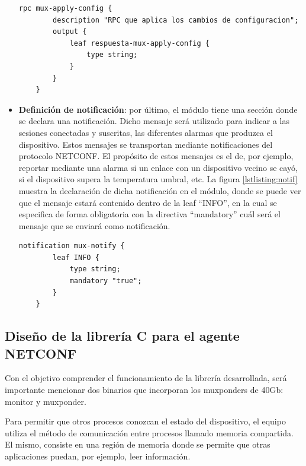 \begin{itemize}
    \newpage

    \begin{lstlisting}[language=SHELXL, caption=Declaración de RPC., label=lstlisting:RPC]
    rpc mux-apply-config {        
        description "RPC que aplica los cambios de configuracion";
        output {
            leaf respuesta-mux-apply-config {
                type string;
            }
        }
    }
    \end{lstlisting}

    \item \textbf{Definición de notificación}: por último, el módulo tiene una sección donde se declara una notificación. Dicho mensaje será utilizado para indicar a las sesiones conectadas y suscritas, las diferentes alarmas que produzca el dispositivo. Estos mensajes se transportan mediante notificaciones del protocolo NETCONF. El propósito de estos mensajes es el de, por ejemplo, reportar mediante una alarma si un enlace con un dispositivo vecino se cayó, si el dispositivo supera la temperatura umbral, etc. La figura \ref{lstlisting:notif} muestra la declaración de dicha notificación en el módulo, donde se puede ver que el mensaje estará contenido dentro de la leaf “INFO”, en la cual se especifica de forma obligatoria con la directiva “mandatory” cuál será el mensaje que se enviará como notificación.

    \begin{lstlisting}[language=SHELXL, caption=Declaración de notificación., label=lstlisting:notif]
    notification mux-notify {
        leaf INFO {
            type string;
            mandatory "true";
        }
    }
    \end{lstlisting}

\end{itemize}

\subsection{Diseño de la librería C para el agente NETCONF}
Con el objetivo comprender el funcionamiento de la librería desarrollada, será importante mencionar dos binarios que incorporan los muxponders de 40Gb: monitor y muxponder. 

Para permitir que otros procesos conozcan el estado del dispositivo, el equipo utiliza el método de comunicación entre procesos llamado memoria compartida. El mismo, consiste en una región de memoria donde se permite que otras aplicaciones puedan, por ejemplo, leer información. 

